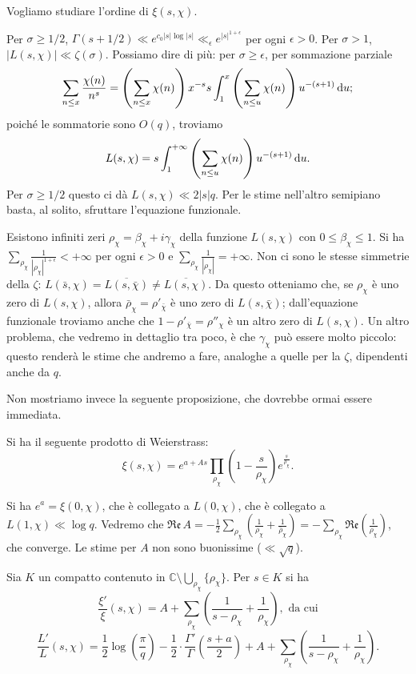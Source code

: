 Vogliamo studiare l'ordine di $\xi(s,\chi)$.

Per $\sigma \ge 1/2$, $\Gamma(s+1/2) \ll e^{c_0|s|\log{|s|}} \ll_{\epsilon} e^{|s|^{1+\epsilon}}$ per ogni $\epsilon>0$. Per $\sigma>1$, $|L(s,\chi)| \ll \zeta(\sigma)$. Possiamo dire di più: per $\sigma \ge \epsilon$, per sommazione parziale
$$\sum_{n \le x} \frac{\chi(n)}{n^s}=\left(\sum_{n \le x}\chi(n)\right)x^{-s}s\int_1^x\left(\sum_{n \le u}\chi(n)\right)u^{-(s+1)}\mathop{}\!\mathrm{d} u;$$
poiché le sommatorie sono $O(q)$, troviamo
$$L(s,\chi)=s\int_1^{+\infty} \left(\sum_{n \le u}\chi(n)\right)u^{-(s+1)}\mathop{}\!\mathrm{d} u.$$
Per $\sigma \ge 1/2$ questo ci dà $L(s,\chi) \ll 2|s|q$. Per le stime nell'altro semipiano basta, al solito, sfruttare l'equazione funzionale.

Esistono infiniti zeri $\rho_\chi=\beta_\chi+i\gamma_\chi$ della funzione $L(s,\chi)$ con $0 \le \beta_\chi \le 1$. Si ha $\displaystyle \sum_{\rho_\chi} \frac{1}{|\rho_\chi|^{1+\epsilon}}<+\infty$ per ogni $\epsilon>0$ e $\displaystyle \sum_{\rho_\chi} \frac{1}{|\rho_\chi|}=+\infty$.
Non ci sono le stesse simmetrie della $\zeta$: $L(\bar{s},\chi)=\overline{L(s,\bar{\chi})}\not=\overline{L(s,\chi)}$. Da questo otteniamo che, se $\rho_\chi$ è uno zero di $L(s,\chi)$, allora $\bar{\rho}_\chi=\rho'_{\bar{\chi}}$ è uno zero di $L(s,\bar{\chi})$; dall'equazione funzionale troviamo anche che $1-\rho'_{\bar{\chi}}=\rho''_\chi$ è un altro zero di $L(s,\chi)$.
Un altro problema, che vedremo in dettaglio tra poco, è che $\gamma_\chi$ può essere molto piccolo: questo renderà le stime che andremo a fare, analoghe a quelle per la $\zeta$, dipendenti anche da $q$.

Non mostriamo invece la seguente proposizione, che dovrebbe ormai essere immediata.

\begin{prop}
  Si ha il seguente prodotto di Weierstrass:
  $$\xi(s,\chi)=e^{a+As}\prod_{\rho_\chi}\left(1-\frac{s}{\rho_\chi}\right)e^{\frac{s}{\rho_\chi}}.$$
\end{prop}

Si ha $e^a=\xi(0,\chi)$, che è collegato a $L(0,\chi)$, che è collegato a $L(1,\chi) \ll \log{q}$. Vedremo che $\displaystyle \mathfrak{Re}\,A=-\frac{1}{2}\sum_{\rho_\chi}\left(\frac{1}{\rho_\chi}+\frac{1}{\bar{\rho}_\chi}\right)=-\sum_{\rho_\chi} \mathfrak{Re}\left(\frac{1}{\rho_\chi}\right)$, che converge. Le stime per $A$ non sono buonissime ($\ll \sqrt{q}$).

\begin{cor} \label{derlogxielle}
  Sia $K$ un compatto contenuto in $\mathbb{C} \setminus \displaystyle \bigcup_{\rho_\chi} \{\rho_\chi\}$. Per $s \in K$ si ha
  $$\frac{\xi'}{\xi}(s,\chi)=A+\sum_{\rho_\chi} \left(\frac{1}{s-\rho_\chi}+\frac{1}{\rho_\chi}\right), \text{ da cui}$$
  $$\frac{L'}{L}(s,\chi)=\frac{1}{2}\log\left(\frac{\pi}{q}\right)-\frac{1}{2}\cdot\frac{\Gamma'}{\Gamma}\left(\frac{s+a}{2}\right)+A+\sum_{\rho_\chi}\left(\frac{1}{s-\rho_\chi}+\frac{1}{\rho_\chi}\right).$$
\end{cor}

